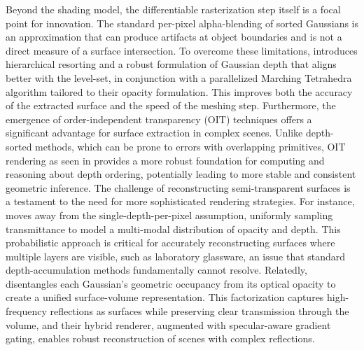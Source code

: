 \documentclass[11pt]{article}
\begin{document}
Beyond the shading model, the differentiable rasterization step itself is a focal point for innovation. The standard per-pixel alpha-blending of sorted Gaussians is an approximation that can produce artifacts at object boundaries and is not a direct measure of a surface intersection. To overcome these limitations, \cite{ref215} introduces hierarchical resorting and a robust formulation of Gaussian depth that aligns better with the level-set, in conjunction with a parallelized Marching Tetrahedra algorithm tailored to their opacity formulation. This improves both the accuracy of the extracted surface and the speed of the meshing step. Furthermore, the emergence of order-independent transparency (OIT) techniques offers a significant advantage for surface extraction in complex scenes. Unlike depth-sorted methods, which can be prone to errors with overlapping primitives, OIT rendering as seen in \cite{ref32} provides a more robust foundation for computing and reasoning about depth ordering, potentially leading to more stable and consistent geometric inference. The challenge of reconstructing semi-transparent surfaces is a testament to the need for more sophisticated rendering strategies. For instance, \cite{ref216} moves away from the single-depth-per-pixel assumption, uniformly sampling transmittance to model a multi-modal distribution of opacity and depth. This probabilistic approach is critical for accurately reconstructing surfaces where multiple layers are visible, such as laboratory glassware, an issue that standard depth-accumulation methods fundamentally cannot resolve. Relatedly, \cite{ref71} disentangles each Gaussian's geometric occupancy from its optical opacity to create a unified surface-volume representation. This factorization captures high-frequency reflections as surfaces while preserving clear transmission through the volume, and their hybrid renderer, augmented with specular-aware gradient gating, enables robust reconstruction of scenes with complex reflections.
\end{document}
